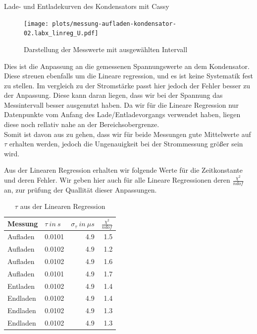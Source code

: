 \documentclass[twoside]{protokoll}
\begin{document}
\begin{aufgabe}{Lade- und Entladekurven des Kondensators mit Cassy}
 
\begin{figure}[H]
    \centering
    \texttt{[image: plots/messung-aufladen-kondensator-02.labx\_linreg\_U.pdf]}
    \caption{Darstellung der Messwerte mit ausgewählten Intervall}
    \centering
\end{figure}
 
 Dies ist die Anpassung an die gemessenen Spannungswerte an dem Kondensator. Diese streuen ebenfalls um die Lineare regression, und es ist keine Systematik fest zu stellen. 
 Im vergleich zu der Stromstärke passt hier jedoch der Fehler besser zu der Anpassung. 
 Diese kann daran liegen, dass wir bei der Spannung das Messintervall besser ausgenutzt haben.
 Da wir für die Lineare Regression nur Datenpunkte vom Anfang des Lade/Entladevorgangs verwendet haben, liegen diese noch rellativ nahe an der Bereichsobergrenze.\\
 
 Somit ist davon aus zu gehen, dass wir für beide Messungen gute Mittelwerte auf $\tau$ erhalten werden, jedoch die Ungenauigkeit bei der Strommessung größer sein wird.

Aus der Linearen Regression erhalten wir folgende Werte für die Zeitkonstante und deren Fehler. Wir geben hier auch für alle Lineare Regressionen deren $\frac{\chi^2}{ndof}$ an, zur prüfung der Quallität dieser Anpassungen.

\begin{table}[H]
        \centering
        \begin{tabularx}{1\textwidth}{X X r r} %
            \toprule
            \textbf{Messung} & \textbf{$\tau \ in \ s$} & \textbf{$\sigma_{\tau} \ in \ \mu s$} & $\frac{\chi^2}{ndof}$ \\
            \midrule
            Aufladen & 0.0101 & 4.9 & 1.5 \\
            Aufladen & 0.0102 & 4.9 & 1.2 \\
            Aufladen & 0.0102 & 4.9 & 1.6 \\
            Aufladen & 0.0101 & 4.9 & 1.7 \\
            Entladen & 0.0102 & 4.9 & 1.4 \\
            Endladen & 0.0102 & 4.9 & 1.4 \\
            Endladen & 0.0102 & 4.9 & 1.3 \\
            Endladen & 0.0102 & 4.9 & 1.3 \\
            \bottomrule
        \end{tabularx}
        \caption{$\tau$ aus der Linearen Regression}
        \label{tab:mytable}
    \end{table}
    

\end{aufgabe}
\end{document}
